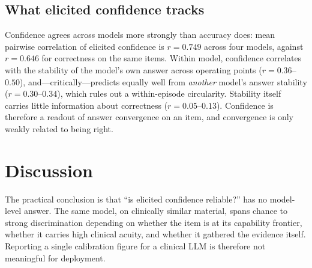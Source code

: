 \documentclass[journal,twoside]{IEEEtran}
\begin{document}
\begin{table}[t]
\caption{Deferral value in interactive consultation, AgentClinic (214 cases $\times$ 3 seeds).}
\label{tab:inter}
\centering
\small
{}
\end{table}

\subsection{What elicited confidence tracks}
Confidence agrees across models more strongly than accuracy does: mean pairwise correlation of
elicited confidence is $r=0.749$ across four models, against $r=0.646$ for correctness on the same
items. Within model, confidence correlates with the stability of the model's own answer across
operating points ($r=0.36$--$0.50$), and---critically---predicts equally well from \emph{another}
model's answer stability ($r=0.30$--$0.34$), which rules out a within-episode circularity. Stability
itself carries little information about correctness ($r=0.05$--$0.13$). Confidence is therefore a
readout of answer convergence on an item, and convergence is only weakly related to being right.

\section{Discussion}

The practical conclusion is that ``is elicited confidence reliable?'' has no model-level answer. The
same model, on clinically similar material, spans chance to strong discrimination depending on
whether the item is at its capability frontier, whether it carries high clinical acuity, and whether
it gathered the evidence itself. Reporting a single calibration figure for a clinical LLM is
therefore not meaningful for deployment.
\end{document}

